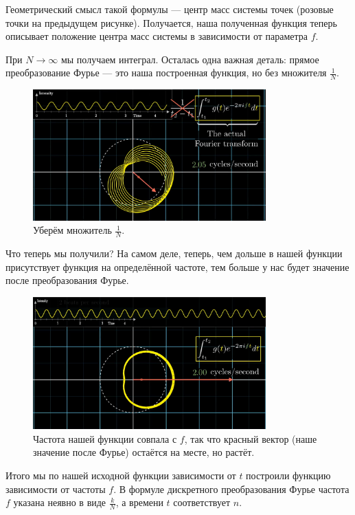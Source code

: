 Геометрический смысл такой формулы --- центр масс системы точек (розовые точки на предыдущем рисунке).
Получается, наша полученная функция теперь описывает положение центра масс системы в зависимости от
параметра $f$.

При $N \to \infty$ мы получаем интеграл. Осталась одна важная деталь: прямое преобразование Фурье --- 
это наша построенная функция, но без множителя $\frac{1}{N}$.

\begin{figure}[H]    
  \centering    
  \includegraphics[width=0.8\textwidth]{figures/dft6.png}    
  \caption*{Уберём множитель $\frac{1}{N}$.}        
\end{figure} 

Что теперь мы получили? На самом деле, теперь, чем дольше в нашей функции присутствует функция на
определённой частоте, тем больше у нас будет значение после преобразования Фурье.

\begin{figure}[H]    
  \centering    
  \includegraphics[width=0.8\textwidth]{figures/dft7.png}    
  \caption*{Частота нашей функции совпала с $f$, так что красный вектор (наше значение после Фурье) остаётся
  на месте, но растёт.}        
\end{figure} 

Итого мы по нашей исходной функции зависимости от $t$ построили функцию зависимости от частоты $f$.
В формуле дискретного преобразования Фурье частота $f$ указана неявно в виде $\frac{k}{N}$, а времени
$t$ соответствует $n$.

